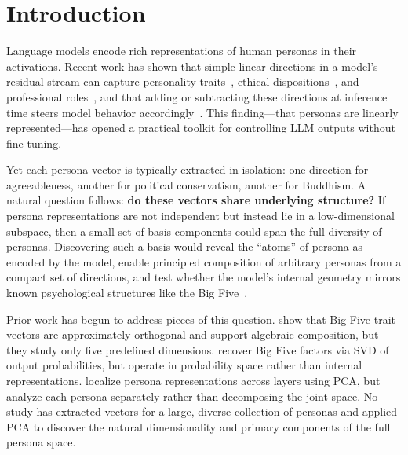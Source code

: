 \section{Introduction}
\label{sec:intro}

Language models encode rich representations of human personas in their activations. Recent work has shown that simple linear directions in a model's residual stream can capture personality traits~\citep{chen2025persona}, ethical dispositions~\citep{zou2023representation}, and professional roles~\citep{poterti2025designing}, and that adding or subtracting these directions at inference time steers model behavior accordingly~\citep{turner2023activation}. This finding---that personas are linearly represented---has opened a practical toolkit for controlling LLM outputs without fine-tuning.

Yet each persona vector is typically extracted in isolation: one direction for agreeableness, another for political conservatism, another for Buddhism. A natural question follows: {\bf do these vectors share underlying structure?} If persona representations are not independent but instead lie in a low-dimensional subspace, then a small set of basis components could span the full diversity of personas. Discovering such a basis would reveal the ``atoms'' of persona as encoded by the model, enable principled composition of arbitrary personas from a compact set of directions, and test whether the model's internal geometry mirrors known psychological structures like the Big Five~\citep{goldberg1990alternative}.

Prior work has begun to address pieces of this question. \citet{feng2026persona} show that Big Five trait vectors are approximately orthogonal and support algebraic composition, but they study only five predefined dimensions. \citet{suh2024rediscovering} recover Big Five factors via SVD of output probabilities, but operate in probability space rather than internal representations. \citet{cintas2025localizing} localize persona representations across layers using PCA, but analyze each persona separately rather than decomposing the joint space. No study has extracted vectors for a large, diverse collection of personas and applied PCA to discover the natural dimensionality and primary components of the full persona space.


